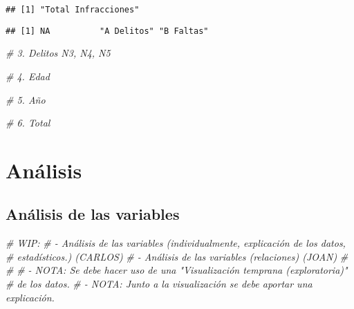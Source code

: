 \documentclass[,,,,pdftex]{Definitions/mdpi}
\newenvironment{Shaded}{\begin{snugshade}}{\end{snugshade}}
\newcommand{\CommentTok}[1]{\textcolor[rgb]{0.56,0.35,0.01}{\textit{#1}}}
\newcommand{\FunctionTok}[1]{\textcolor[rgb]{0.13,0.29,0.53}{\textbf{#1}}}
\newcommand{\NormalTok}[1]{#1}
\newcommand{\SpecialCharTok}[1]{\textcolor[rgb]{0.81,0.36,0.00}{\textbf{#1}}}
\newcommand{\StringTok}[1]{\textcolor[rgb]{0.31,0.60,0.02}{#1}}
\begin{document}
\begin{verbatim}
## [1] "Total Infracciones"
\end{verbatim}

\begin{Shaded}
\end{Shaded}

\begin{verbatim}
## [1] NA          "A Delitos" "B Faltas"
\end{verbatim}

\begin{Shaded}
\begin{Highlighting}[]
\CommentTok{\# 3. Delitos N3, N4, N5}

\CommentTok{\# 4. Edad}

\CommentTok{\# 5. Año}

\CommentTok{\# 6. Total}
\end{Highlighting}
\end{Shaded}

\section{Análisis}\label{anuxe1lisis}

\subsection{Análisis de las
variables}\label{anuxe1lisis-de-las-variables}

\begin{Shaded}
\begin{Highlighting}[]
\CommentTok{\# WIP:}
\CommentTok{\#   {-} Análisis de las variables (individualmente, explicación de los datos,}
\CommentTok{\#                                estadísticos.) (CARLOS)}
\CommentTok{\#   {-} Análisis de las variables (relaciones) (JOAN)}
\CommentTok{\# }
\CommentTok{\#}
\CommentTok{\# {-} NOTA: Se debe hacer uso de una "Visualización temprana (exploratoria)"}
\CommentTok{\#   de los datos. }
\CommentTok{\# {-} NOTA: Junto a la visualización se debe aportar una explicación.}
\end{Highlighting}
\end{Shaded}
\end{document}
